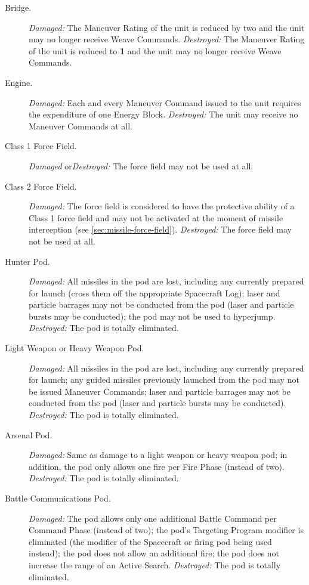 \begin{description}
\item[Bridge.] \emph{Damaged:} The Maneuver Rating of the unit is
  reduced by two and the unit may no longer receive Weave Commands.
  \emph{Destroyed:} The Maneuver Rating of the unit is reduced to
  \textbf{1} and the unit may no longer receive Weave Commands.
\item[Engine.] \emph{Damaged:} Each and every Maneuver Command issued
  to the unit requires the expenditure of one Energy Block.
  \emph{Destroyed:} The unit may receive no Maneuver Commands at all.
\item[Class 1 Force Field.] \emph{Damaged} or\emph{Destroyed:} The force
  field may not be used at all.
\item[Class 2 Force Field.] \emph{Damaged:} The force field is
  considered to have the protective ability of a Class 1 force field
  and may not be activated at the moment of missile interception (see
  \ref{sec:missile-force-field}). \emph{Destroyed:} The force field
  may not be used at all.
\item[Hunter Pod.] \emph{Damaged:} All missiles in the pod are lost,
  including any currently prepared for launch (cross them off the
  appropriate Spacecraft Log); laser and particle barrages may not be
  conducted from the pod (laser and particle bursts may be conducted);
  the pod may not be used to hyperjump. \emph{Destroyed:} The pod is
  totally eliminated.
\item[Light Weapon or Heavy Weapon Pod.] \emph{Damaged:} All missiles
  in the pod are lost, including any currently prepared for launch;
  any guided missiles previously launched from the pod may not be
  issued Maneuver Commands; laser and particle barrages may not be
  conducted from the pod (laser and particle bursts may be conducted).
  \emph{Destroyed:} The pod is totally eliminated.
\item[Arsenal Pod.] \emph{Damaged:} Same as damage to a light weapon
  or heavy weapon pod; in addition, the pod only allows one fire per
  Fire Phase (instead of two). \emph{Destroyed:} The pod is totally
  eliminated.
\item[Battle Communications Pod.] \emph{Damaged:} The pod allows only
  one additional Battle Command per Command Phase (instead of two);
  the pod's Targeting Program modifier is eliminated (the modifier of
  the Spacecraft or firing pod being used instead); the pod does not
  allow an additional fire; the pod does not increase the range of an
  Active Search. \emph{Destroyed:} The pod is totally eliminated.

\end{description}
